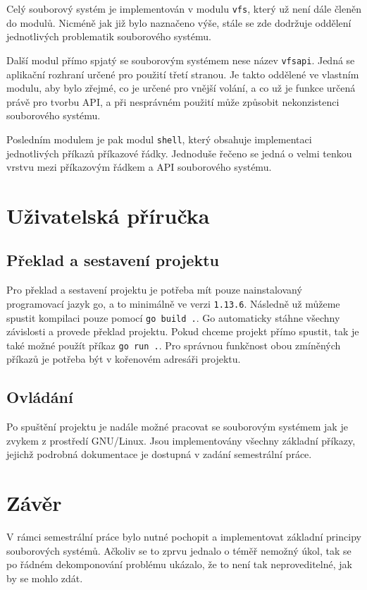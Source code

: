 \documentclass[12pt, a4paper]{article}
\begin{document}
    Celý souborový systém je implementován v modulu \texttt{vfs}, který už není dále členěn do modulů.
    Nicméně jak již bylo naznačeno výše, stále se zde dodržuje oddělení jednotlivých problematik souborového systému.

    Další modul přímo spjatý se souborovým systémem nese název \texttt{vfsapi}.
    Jedná se aplikační rozhraní určené pro použití třetí stranou.
    Je takto oddělené ve vlastním modulu, aby bylo zřejmé, co je určené pro vnější volání, a co už je funkce určená právě pro tvorbu API, a při nesprávném použití může způsobit nekonzistenci souborového systému.

    Posledním modulem je pak modul \texttt{shell}, který obsahuje implementaci jednotlivých příkazů příkazové řádky.
    Jednoduše řečeno se jedná o velmi tenkou vrstvu mezi příkazovým řádkem a API souborového systému.

    \section{Uživatelská příručka}
    \subsection{Překlad a sestavení projektu}
    Pro překlad a sestavení projektu je potřeba mít pouze nainstalovaný programovací jazyk go, a to minimálně ve verzi \texttt{1.13.6}.
    Následně už můžeme spustit kompilaci pouze pomocí \texttt{go build .}.
    Go automaticky stáhne všechny závislosti a provede překlad projektu.
    Pokud chceme projekt přímo spustit, tak je také možné použít příkaz \texttt{go run .}.
    Pro správnou funkčnost obou zmíněných příkazů je potřeba být v kořenovém adresáři projektu.

    \subsection{Ovládání}
    Po spuštění projektu je nadále možné pracovat se souborovým systémem jak je zvykem z prostředí GNU/Linux.
    Jsou implementovány všechny základní příkazy, jejichž podrobná dokumentace je dostupná v zadání semestrální práce.

    \section{Závěr}
    V rámci semestrální práce bylo nutné pochopit a implementovat základní principy souborových systémů.
    Ačkoliv se to zprvu jednalo o téměř nemožný úkol, tak se po řádném dekomponování problému ukázalo, že to není tak neproveditelné, jak by se mohlo zdát.
\end{document}
